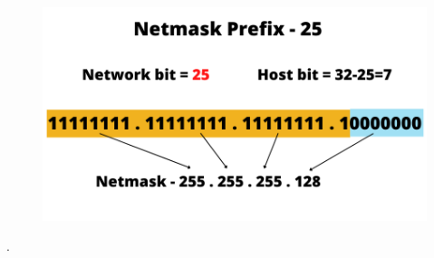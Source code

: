 \begin{flushleft}
\begin{figure}[h!]
\end{figure}
\bigskip
\begin{figure}[h!]
	\centering
	\includegraphics[scale=0.5]{content/chapter14/images/21.png}
\end{figure}
\newpage
.
\newpage

\end{flushleft}



